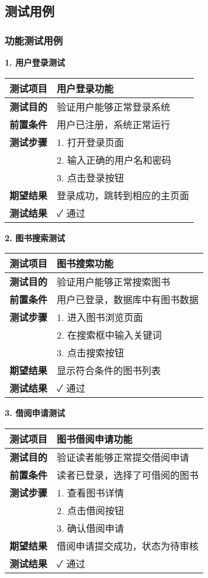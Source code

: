 \documentclass[12pt,a4paper]{article}
\begin{document}
\subsection{测试用例}

\subsubsection{功能测试用例}

\textbf{1. 用户登录测试}
\begin{longtable}{|l|p{8cm}|}
\hline
\textbf{测试项目} & 用户登录功能 \\
\hline
\textbf{测试目的} & 验证用户能够正常登录系统 \\
\hline
\textbf{前置条件} & 用户已注册，系统正常运行 \\
\hline
\textbf{测试步骤} & 1. 打开登录页面\\
& 2. 输入正确的用户名和密码\\
& 3. 点击登录按钮 \\
\hline
\textbf{期望结果} & 登录成功，跳转到相应的主页面 \\
\hline
\textbf{测试结果} & ✓ 通过 \\
\hline
\end{longtable}

\textbf{2. 图书搜索测试}
\begin{longtable}{|l|p{8cm}|}
\hline
\textbf{测试项目} & 图书搜索功能 \\
\hline
\textbf{测试目的} & 验证用户能够正常搜索图书 \\
\hline
\textbf{前置条件} & 用户已登录，数据库中有图书数据 \\
\hline
\textbf{测试步骤} & 1. 进入图书浏览页面\\
& 2. 在搜索框中输入关键词\\
& 3. 点击搜索按钮 \\
\hline
\textbf{期望结果} & 显示符合条件的图书列表 \\
\hline
\textbf{测试结果} & ✓ 通过 \\
\hline
\end{longtable}

\textbf{3. 借阅申请测试}
\begin{longtable}{|l|p{8cm}|}
\hline
\textbf{测试项目} & 图书借阅申请功能 \\
\hline
\textbf{测试目的} & 验证读者能够正常提交借阅申请 \\
\hline
\textbf{前置条件} & 读者已登录，选择了可借阅的图书 \\
\hline
\textbf{测试步骤} & 1. 查看图书详情\\
& 2. 点击借阅按钮\\
& 3. 确认借阅申请 \\
\hline
\textbf{期望结果} & 借阅申请提交成功，状态为待审核 \\
\hline
\textbf{测试结果} & ✓ 通过 \\
\hline
\end{longtable}
\end{document}
